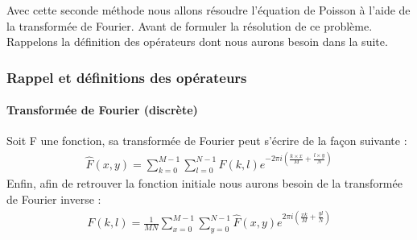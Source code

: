 Avec cette seconde méthode nous allons résoudre l'équation de Poisson à l'aide de la transformée de Fourier. Avant de formuler la résolution de ce problème. Rappelons la définition des opérateurs dont nous aurons besoin dans la suite. \cite{Fourier}
\subsubsection{Rappel et définitions des opérateurs}
\paragraph{Transformée de Fourier (discrète)}
Soit F une fonction, sa transformée de Fourier peut s'écrire de la façon suivante : 
\begin{equation}
\begin{aligned}
\widehat{F}(x,y) = \sum_{k = 0}^{M-1} \sum_{l = 0}^{N-1} F(k,l) e^{-2\pi i\left(\frac{k\times x}{M}+\frac{l\times y}{N}\right)}
\end{aligned}
\end{equation}
Enfin, afin de retrouver la fonction initiale nous aurons besoin de la transformée de Fourier inverse : 
\begin{equation}
\begin{aligned}
F(k,l) = \frac{1}{MN} \sum_{x = 0}^{M-1} \sum_{y = 0}^{N-1} \hat{F}(x,y) e^{2\pi i \left(\frac{xk}{M}+\frac{yl}{N}\right)}
\end{aligned}
\end{equation}
